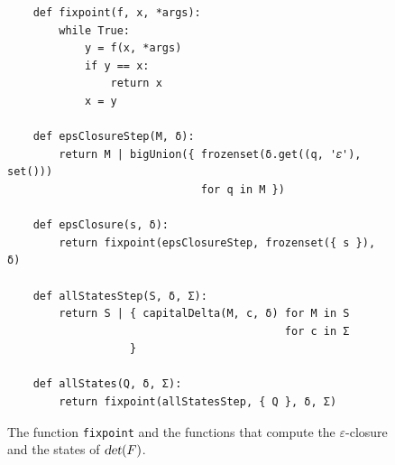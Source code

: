 \begin{figure}[!ht]
\centering
\begin{verbatim}
    def fixpoint(f, x, *args):
        while True:
            y = f(x, *args)
            if y == x:
                return x
            x = y

    def epsClosureStep(M, δ):
        return M | bigUnion({ frozenset(δ.get((q, '𝜀'), set()))
                              for q in M })

    def epsClosure(s, δ):
        return fixpoint(epsClosureStep, frozenset({ s }), δ)

    def allStatesStep(S, δ, Σ):
        return S | { capitalDelta(M, c, δ) for M in S
                                           for c in Σ
                   }

    def allStates(Q, δ, Σ):
        return fixpoint(allStatesStep, { Q }, δ, Σ)
\end{verbatim}
\vspace*{-0.3cm}
\caption{The function \texttt{fixpoint} and the functions that compute the $\varepsilon$-closure and the states of
  $\textsl{det}(F)$.}
\label{fig:01-NFA-2-DFA.ipynb:fixpoint}
\end{figure}

